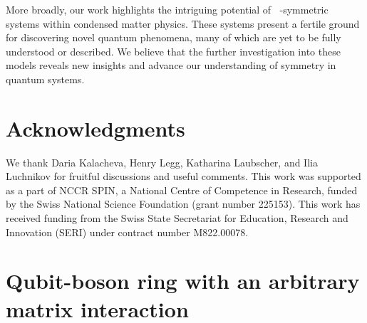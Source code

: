 \documentclass[reprint, aps, prx, amsmath, amssymb, longbibliography, superscriptaddress]{revtex4-2}
\DeclareMathOperator{\Zn}{\mathbb{Z}_n}
\begin{document}
More broadly, our work highlights the intriguing potential of $\Zn$-symmetric systems within condensed matter physics. These systems present a fertile ground for discovering novel quantum phenomena, many of which are yet to be fully understood or described. We believe that the further investigation into these models reveals new insights and advance our understanding of symmetry in quantum systems.

\section*{Acknowledgments} 

We thank Daria Kalacheva, Henry Legg, Katharina Laubscher, and Ilia Luchnikov for fruitful discussions and useful comments. This work was supported as a part of NCCR SPIN, a National Centre of Competence in Research, funded by the Swiss National Science Foundation (grant number 225153). This work has received funding from the Swiss State Secretariat for Education, Research and Innovation (SERI) under contract number M822.00078.


\appendix


\section{Qubit-boson ring with an arbitrary matrix interaction}
\label{arbitrary-interaction}
\end{document}

